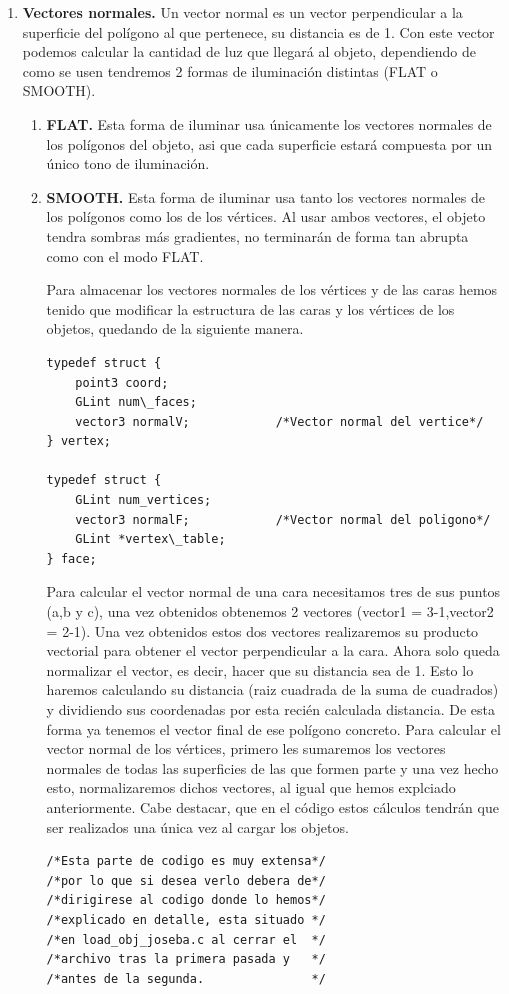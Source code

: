 \documentclass[12pt,a4paper]{article}
\begin{document}
\begin{enumerate}
\item \textbf{Vectores normales.}
Un vector normal es un vector perpendicular a la superficie del polígono al que pertenece, su distancia es de 1. Con este vector podemos calcular la cantidad de luz que llegará al objeto, dependiendo de como se usen tendremos 2 formas de iluminación distintas (FLAT o SMOOTH). \newline
\begin{enumerate}
\item\textbf{FLAT.}
Esta forma de iluminar usa únicamente los vectores normales de los polígonos del objeto, asi que cada superficie estará compuesta por un único tono de iluminación.
\item\textbf{SMOOTH.}
Esta forma de iluminar usa tanto los vectores normales de los polígonos como los de los vértices. Al usar ambos vectores, el objeto tendra sombras más gradientes, no terminarán de forma tan abrupta como con el modo FLAT.\newline

Para almacenar los vectores normales de los vértices y de las caras hemos tenido que modificar la estructura de las caras y los vértices de los objetos, quedando de la siguiente manera.
\begin{lstlisting}
typedef struct {
    point3 coord;    
    GLint num\_faces;  
    vector3 normalV;			/*Vector normal del vertice*/
} vertex;

typedef struct {
    GLint num_vertices;   
    vector3 normalF;			/*Vector normal del poligono*/
    GLint *vertex\_table; 
} face;
\end{lstlisting}

Para calcular el vector normal de una cara necesitamos tres de sus puntos (a,b y c), una vez obtenidos obtenemos 2 vectores (vector1 = 3-1,vector2 = 2-1). Una vez obtenidos estos dos vectores realizaremos su producto vectorial para obtener el vector perpendicular a la cara.\newline
Ahora solo queda normalizar el vector, es decir, hacer que su distancia sea de 1. Esto lo haremos calculando su distancia (raiz cuadrada de la suma de cuadrados) y dividiendo sus coordenadas por esta recién calculada distancia. De esta forma ya tenemos el vector final de ese polígono concreto.\newline
Para calcular el vector normal de los vértices, primero les sumaremos los vectores normales de todas las superficies de las que formen parte y una vez hecho esto, normalizaremos dichos vectores, al igual que hemos explciado anteriormente.\newline
Cabe destacar, que en el código estos cálculos tendrán que ser realizados una única vez al cargar los objetos. 
\begin{lstlisting}
/*Esta parte de codigo es muy extensa*/
/*por lo que si desea verlo debera de*/
/*dirigirese al codigo donde lo hemos*/
/*explicado en detalle, esta situado */
/*en load_obj_joseba.c al cerrar el  */
/*archivo tras la primera pasada y   */
/*antes de la segunda.               */
\end{lstlisting}


\end{enumerate}
\end{enumerate}
\end{document}
